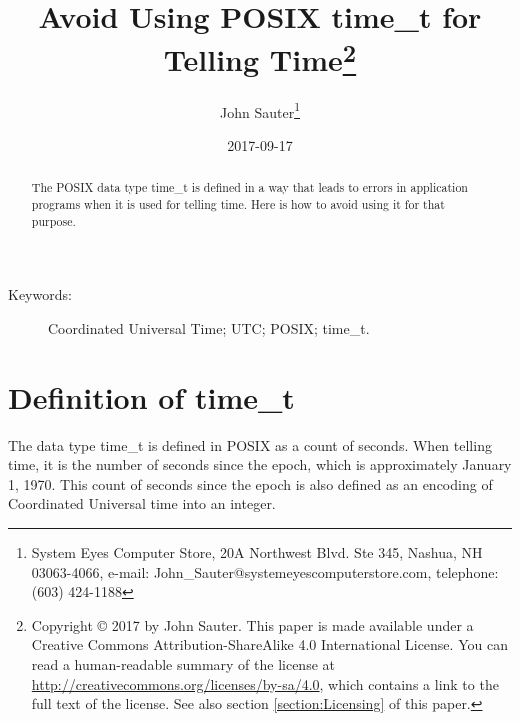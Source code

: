 \documentclass[letterpaper,twoside]{article}
\begin{document}
\title{Avoid Using POSIX {\ttfamily time\_t} for Telling
  Time\footnote{Copyright
    {\copyright} 2017 by John Sauter.
    This paper is made available under a
    Creative Commons Attribution-ShareAlike 4.0 International License.
    You can read a human-readable summary of the license at
    \url{http://creativecommons.org/licenses/by-sa/4.0}, which contains
    a link to the full text of the license.
    See also section \ref{section:Licensing} of this paper.}
}
\author{John Sauter\footnote{
    System Eyes Computer Store,
    20A Northwest Blvd.  Ste 345,
    Nashua, NH  03063-4066,
    e-mail: John\_Sauter@systemeyescomputerstore.com,
    telephone: (603) 424-1188}}
\date{2017-09-17}
\maketitle
\begin{abstract}
  The POSIX data type {\ttfamily time\_t} is defined in a way that leads
  to errors in application programs when it is used for telling time.
  Here is how to avoid using it for that purpose.
\end{abstract}
\begin{description}
\item[Keywords:]Coordinated Universal Time; UTC; POSIX; time\_t.
\end{description}
  
\newpage

\section{Definition of {\ttfamily time\_t}}
The data type {\ttfamily time\_t} is defined in POSIX\citep{7582338}
as a count of seconds.
When telling time, it is the number of seconds
since the epoch, which is approximately January 1, 1970.  This count of
seconds since the epoch is also
defined as an encoding of Coordinated Universal time into an integer.
\end{document}
